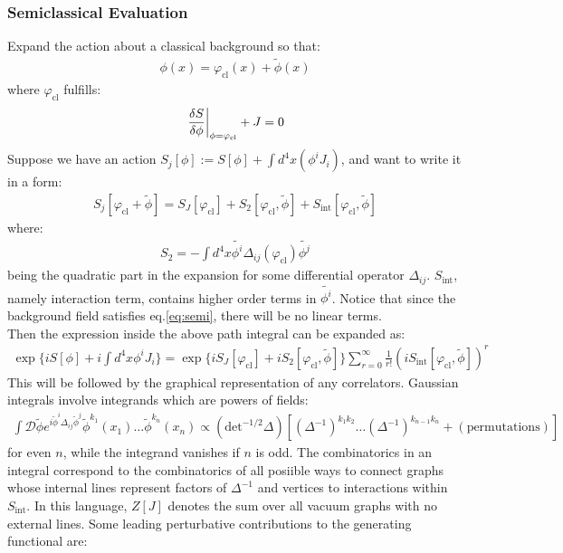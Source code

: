 \subsubsection{Semiclassical Evaluation}
Expand the action about a classical background so that:
\begin{align}
    \phi(x) = \varphi_{\text{cl}} (x) + \tilde{\phi}(x) 
\end{align}
where $\varphi_{\text{cl}}$ fulfills:
\begin{align}
    \label{eq:semi}
    \eval {\fdv{S}{\phi}}_{\phi = \varphi_{\text{cl}}} + J = 0
\end{align}
Suppose we have an action $S_{j}[\phi] := S[\phi] + \int d^{4}x (\phi ^{i} J_{i})$, and want to write it in a form:
\begin{align}
    S_{j} [\varphi_{\text{cl}} + \tilde{\phi}] = S_{J}[\varphi _{\text{cl}}] + S_{2} [\varphi _{\text{cl}}, \tilde{\phi}] + S_{\text{int}}[\varphi_{\text{cl}}, \tilde{\phi}]
\end{align} 
where:
\begin{align}
    S_{2} = -\int d^{4} x \tilde{\phi^{i}}\Delta _{ij}(\varphi_{\text{cl}}) \tilde{\phi ^{j}}
\end{align}
being the quadratic part in the expansion for some differential operator $\Delta _{ij}$. $S_{\text{int}}$, namely interaction term, contains higher order terms in $\tilde{\phi^{i}}$. Notice that since the background field satisfies eq.\ref{eq:semi}, there will be no linear terms. \\
\indent Then the expression inside the above path integral can be expanded as:
\begin{align}
    \exp \lbrace iS[\phi] + i\int d^{4}x \phi^{i}J_{i} \rbrace = \exp \lbrace iS_{J}[\varphi_{\text{cl}}]+ iS_{2} [\varphi_{\text{cl}}, \tilde{\phi}] \rbrace \sum_{r=0}^{\infty} \frac{1}{r!} (iS_{\text{int}}[\varphi_{\text{cl}},\tilde{\phi}])^{r}
\end{align}
This will be followed by the graphical representation of any correlators. Gaussian integrals involve integrands which are powers of fields:
\begin{align}
    \int \mathcal{D} \tilde{\phi} e^{i\tilde{\phi}^{i}\Delta _{ij} \tilde{\phi}^{j}} \tilde{\phi}^{k_{1}}(x_{1}) \dots \tilde{\phi}^{k_{n}} (x_{n}) \propto (\text{det}^{-1/2} \Delta) [(\Delta ^{-1})^{k_{1}k_{2}} \dots (\Delta ^{-1})^{k_{n-1}k_{n}} + (\text{permutations})]
\end{align}
for even $n$, while the integrand vanishes if $n$ is odd. The combinatorics in an integral correspond to the combinatorics of all posiible ways to connect graphs whose internal lines represent factors of $\Delta ^{-1}$ and vertices to interactions within $S_{\text{int}}$. In this language, $Z[J]$ denotes the sum over all vacuum graphs with no external lines. Some leading perturbative contributions to the generating functional are:
